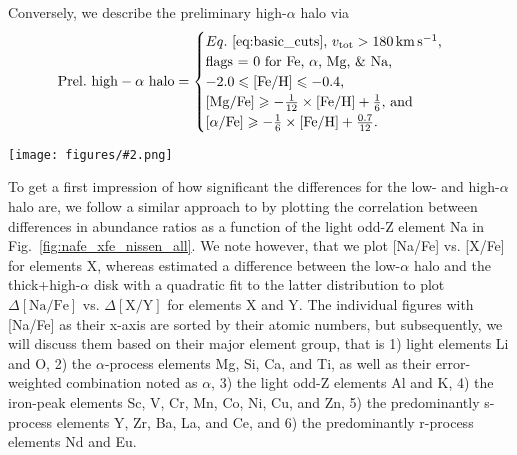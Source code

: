 \documentclass[fleqn,usenatbib]{mnras}
\newcommand{\codeicon}{{\faCloudDownload}}
\newcommand{\codelink}[1]{\href{https://github.com/svenbuder/buder_galah_accreted_chemistry/tree/main/figures/#1.ipynb}{\codeicon}\,\,}
\newcommand{\oscaption}[2]{\caption{#2 \codelink{#1}}}
\newcommand{\figuretextwidth}[4]{\begin{figure*} \centering \texttt{[image: figures/\#2.png]}\oscaption{#3}{#4}\label{fig:#2} \end{figure*}}
\begin{document}
Conversely, we describe the preliminary high-$\alpha$ halo via
\begin{equation} \label{eq:prelim_high_alpha_halo}
\mathrm{Prel.~high-\alpha~halo} =
\begin{cases}
Eq.~\ref{eq:basic_cuts}\text{, } v_\text{tot} > 180\,\mathrm{km\,s^{-1}} \text{, } \\
\text{flags = 0 for Fe, }\alpha\text{, Mg, \& Na, } \\
-2.0 \leq \mathrm{[Fe/H]} \leq -0.4 \text{, }\\
\mathrm{[Mg/Fe]} \geq - \frac{1}{12} \times \mathrm{[Fe/H]} + \frac{1}{6} \text{, and}\\
\mathrm{[\alpha/Fe]} \geq - \frac{1}{6} \times \mathrm{[Fe/H]} + \frac{0.7}{12}.\\
\end{cases}
\end{equation}

\figuretextwidth{17cm}{nafe_xfe_nissen_all}{chemical_differences}{
\textbf{Abundances [X/Fe] for the the 28 elements measured by GALAH in addition to Na and Fe, whose abundance ratio [Na/Fe] is used on the ordinate.} The density distribution of the base sample of GALAH+ DR3 (Eq.~\ref{eq:basic_cuts}) is shown in greyscale. GALAH+ DR3 stars which are preliminary tagged to the low-$\alpha$ halo (via Eq.~\ref{eq:prelim_low_alpha_halo}) are shown in orange.
We also show the data by \citet{Nissen2010} for $\alpha$, Na, Mg, Si, Ca, Ti, Cr, and Ni with red circles for their low-$\alpha$ halo stars, blue open circles for their high-$\alpha$ halo stars and black crossed for their thick disk stars. For the same stars of this study, we plot the data by \citet{Nissen2011} for Mn, Cu, Zn, Y, and Ba, \citet{Nissen2012} for Li (their non-LTE values), \citet{Nissen2014} for O (their non-LTE values based on the $\lambda 7774$ \ion{O}{i} triplet), and \citet{Fishlock2017} for Sc, Zr, La, Ce, Nd, and Eu. Arrows show upper limits coloured by their respective selection.} 

To get a first impression of how significant the differences for the low- and high-$\alpha$ halo are, we follow a similar approach to \citet[][see their Fig.~5]{Nissen2011} by plotting the correlation between differences in abundance ratios as a function of the light odd-Z element Na in Fig.~\ref{fig:nafe_xfe_nissen_all}. We note however, that we plot [Na/Fe] vs. [X/Fe] for elements X, whereas \citet{Nissen2011} estimated a difference between the low-$\alpha$ halo and the thick+high-$\alpha$ disk with a quadratic fit to the latter distribution to plot $\Delta \mathrm{[Na/Fe]}$ vs. $\Delta \mathrm{[X/Y]}$ for elements X and Y. The individual figures with [Na/Fe] as their x-axis are sorted by their atomic numbers, but subsequently, we will discuss them based on their major element group, that is 1) light elements Li and O, 2) the $\alpha$-process elements Mg, Si, Ca, and Ti, as well as their error-weighted combination noted as $\alpha$, 3) the light odd-Z elements Al and K, 4) the iron-peak elements Sc, V, Cr, Mn, Co, Ni, Cu, and Zn, 5) the predominantly s-process elements Y, Zr, Ba, La, and Ce, and 6) the predominantly r-process elements Nd and Eu.
\end{document}
